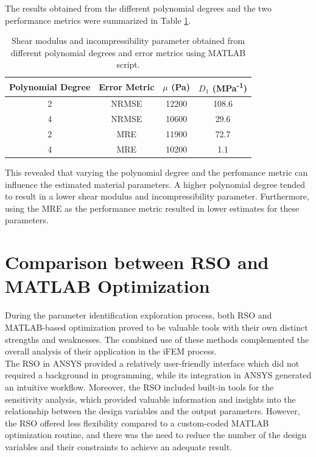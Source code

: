 The results obtained from the different polynomial degrees and the two performance metrics were summarized
in Table \ref{tab:materialsetMATLAB}.
\begin{table}[h!]
	\centering
	\begin{tabular}{|c|c|c|c|}
	\hline
	\textbf{Polynomial Degree} & \textbf{Error Metric} & $\mu$ (Pa) &	$D_1$ (MPa\textsuperscript{-1}) \\
	\hline
	2 & NRMSE & 12200 & 108.6 \\
	4 & NRMSE & 10600 & 29.6 \\
	2 & MRE & 11900 & 72.7 \\
	4 & MRE & 10200 & 1.1 \\
	\hline
	\end{tabular}
	\caption[Material parameter sets obtained from MATLAB]{Shear modulus and incompressibility parameter obtained from different polynomial degrees and error metrics using MATLAB script.}
	\label{tab:materialsetMATLAB}
\end{table}

This revealed that varying the polynomial degree and the perfomance metric can influence the estimated material parameters. 
A higher polynomial degree tended to result in a lower shear modulus and incompressibility parameter. Furthermore, 
using the MRE as the performance metric resulted in lower estimates for these parameters.\\

\section{Comparison between RSO and MATLAB Optimization}
\label{section:comparisonrsomatlab}

During the parameter identification exploration process, both RSO and MATLAB-based optimization proved to be valuable tools with 
their own distinct strengths and weaknesses. The combined use of these methods complemented the overall analysis of their application in the
iFEM process.\\

The RSO in ANSYS provided a relatively user-friendly interface which did not required a background in programming, while its integration
in ANSYS generated an intuitive workflow. Moreover, the RSO included built-in tools for the sensitivity analysis, which provided 
valuable information and insights into the relationship between the design variables and the output parameters. 
However, the RSO offered less flexibility compared to a custom-coded MATLAB optimization routine, and there was the need to 
reduce the number of the design variables and their constraints to achieve an adequate result.\\

